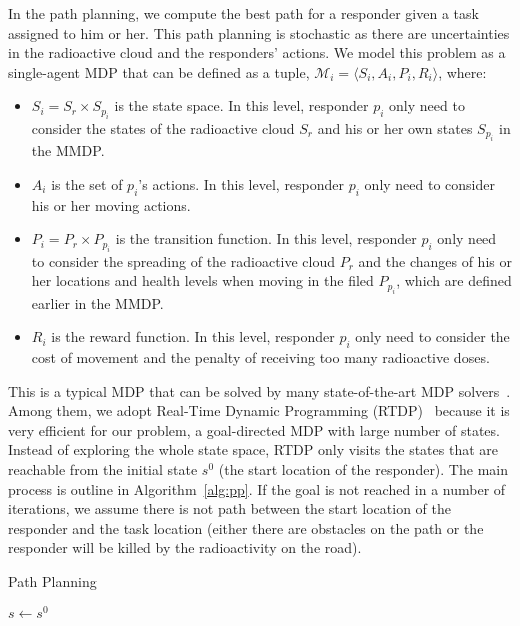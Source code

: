 \noindent In the path planning, we compute the best path for a
responder given a task assigned to him or her. This path planning
is stochastic as there are uncertainties in the radioactive cloud
and the responders' actions. We model this problem as a
single-agent MDP that can be defined as a tuple, $\mathcal{M}_i =
\langle S_i, A_i, P_i, R_i \rangle$, where:
\begin{itemize}
  \item $S_i = S_r \times S_{p_i}$ is the state space. In this
      level, responder $p_i$ only need to consider the states
      of the radioactive cloud $S_r$ and his or her own states
      $S_{p_i}$ in the MMDP.
  \item $A_i$ is the set of $p_i$'s actions. In this level,
      responder $p_i$ only need to consider his or her moving
      actions.
  \item $P_i = P_r \times P_{p_i}$ is the transition function.
      In this level, responder $p_i$ only need to consider the
      spreading of the radioactive cloud $P_r$ and the changes
      of his or her locations and health levels when moving in
      the filed $P_{p_i}$, which are defined earlier in the
      MMDP.
  \item $R_i$ is the reward function. In this level, responder
      $p_i$ only need to consider the cost of movement and the
      penalty of receiving too many radioactive doses.
\end{itemize}

This is a typical MDP that can be solved by many state-of-the-art
MDP solvers~\cite{?}. Among them, we adopt Real-Time Dynamic
Programming (RTDP)~\cite{?} because it is very efficient for our
problem, a goal-directed MDP with large number of states. Instead
of exploring the whole state space, RTDP only visits the states
that are reachable from the initial state $s^0$ (the start location
of the responder). The main process is outline in
Algorithm~\ref{alg:pp}. If the goal is not reached in a number of
iterations, we assume there is not path between the start location
of the responder and the task location (either there are obstacles
on the path or the responder will be killed by the radioactivity on
the road).

\begin{algorithm}[t]
  \caption{Path Planning}
  $s \gets s^0$ \;
  \label{alg:pp}
\end{algorithm}

